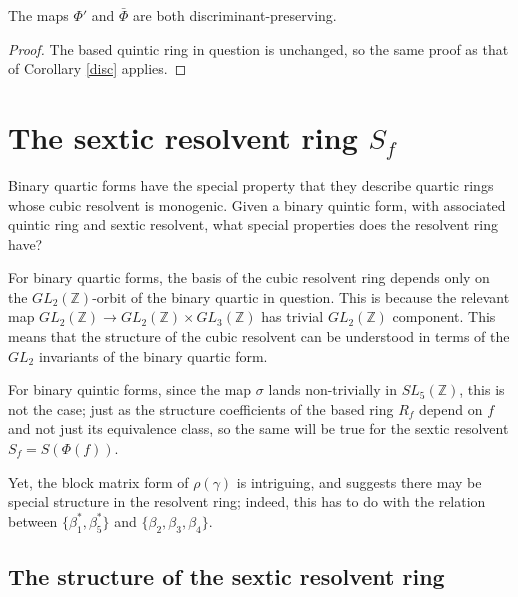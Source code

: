\documentclass{report}
\begin{document}
\begin{corollary}
The maps $\Phi'$ and $\bar{\Phi}$ are both discriminant-preserving.
\end{corollary}
\begin{proof}
The based quintic ring in question is unchanged, so the same proof as that of Corollary \ref{disc} applies.
\end{proof}








\chapter{The sextic resolvent ring $S_f$} \label{sextic section}

Binary quartic forms have the special property that they describe quartic rings whose cubic resolvent is monogenic.  Given a binary quintic form, with associated quintic ring and sextic resolvent, what special properties does the resolvent ring have?

For binary quartic forms, the basis of the cubic resolvent ring depends only on the $GL_2(\mathbb{Z})$-orbit of the binary quartic in question.  This is because the relevant map $GL_2(\mathbb{Z}) \to GL_2(\mathbb{Z}) \times GL_3(\mathbb{Z})$ has trivial $GL_2(\mathbb{Z})$ component.  This means that the structure of the cubic resolvent can be understood in terms of the $GL_2$ invariants of the binary quartic form.

For binary quintic forms, since the map $\sigma$ lands non-trivially in $SL_5(\mathbb{Z})$, this is not the case; just as the structure coefficients of the based ring $R_f$ depend on $f$ and not just its equivalence class, so the same will be true for the sextic resolvent $S_f = S(\Phi(f))$.

Yet, the block matrix form of $\rho(\gamma)$ is intriguing, and suggests there may be special structure in the resolvent ring; indeed, this has to do with the relation between $\{ \beta_1^*, \beta_5^* \}$ and $\{ \beta_2, \beta_3, \beta_4 \}$.

\section{The structure of the sextic resolvent ring}
\end{document}
